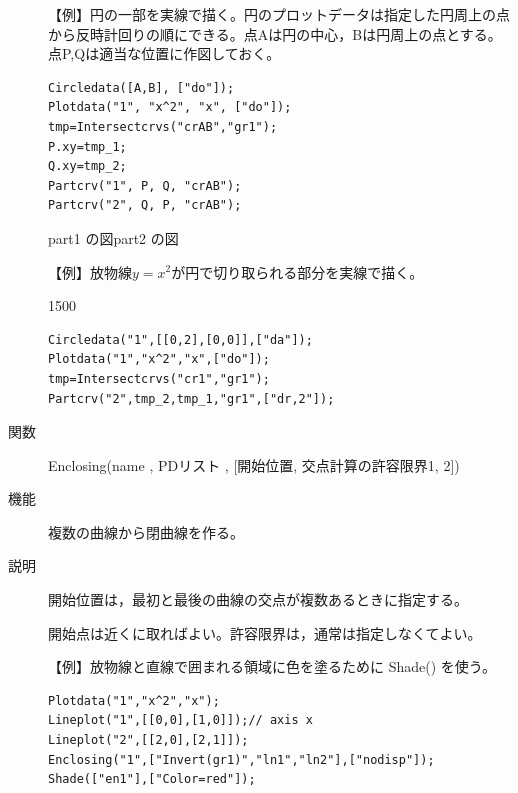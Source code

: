 \documentclass[papersize,a4paper,10pt,uplatex]{jsarticle}
\begin{document}
\begin{description}
【例】円の一部を実線で描く。円のプロットデータは指定した円周上の点から反時計回りの順にできる。点Aは円の中心，Bは円周上の点とする。点P,Qは適当な位置に作図しておく。
\begin{verbatim}
Circledata([A,B], ["do"]);
Plotdata("1", "x^2", "x", ["do"]);
tmp=Intersectcrvs("crAB","gr1");
P.xy=tmp_1;
Q.xy=tmp_2;
Partcrv("1", P, Q, "crAB");
Partcrv("2", Q, P, "crAB");
\end{verbatim}
\vspace{\baselineskip}
\hspace{10mm}  \hspace{10mm}  
 
\hspace{25mm}part1 の図\hspace{45mm}part2 の図

\vspace{\baselineskip}
【例】放物線$y=x^2$が円で切り取られる部分を実線で描く。

\begin{layer}{150}{0}
\end{layer}
\begin{verbatim}
Circledata("1",[[0,2],[0,0]],["da"]);
Plotdata("1","x^2","x",["do"]);
tmp=Intersectcrvs("cr1","gr1");
Partcrv("2",tmp_2,tmp_1,"gr1",["dr,2"]);

\end{verbatim}

\vspace{\baselineskip}
\vspace{\baselineskip}
\vspace{\baselineskip}


\vspace{\baselineskip}
\hypertarget{enclosing}{}
\item[関数]Enclosing(name , PDリスト , [開始位置, 交点計算の許容限界1, 2])
\item[機能]複数の曲線から閉曲線を作る。
\item[説明]開始位置は，最初と最後の曲線の交点が複数あるときに指定する。

開始点は近くに取ればよい。許容限界は，通常は指定しなくてよい。

\vspace{\baselineskip}
【例】放物線と直線で囲まれる領域に色を塗るために Shade() を使う。
\begin{verbatim}
Plotdata("1","x^2","x");
Lineplot("1",[[0,0],[1,0]]);// axis x
Lineplot("2",[[2,0],[2,1]]);
Enclosing("1",["Invert(gr1)","ln1","ln2"],["nodisp"]);
Shade(["en1"],["Color=red"]);
\end{verbatim}
\vspace{\baselineskip}
 \begin{center}  \end{center}


\end{description}
\end{document}
